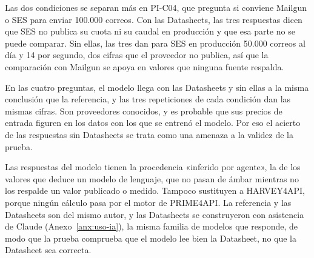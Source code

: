 Las dos condiciones se separan más en PI-C04, que pregunta si conviene Mailgun o SES para enviar 100.000 correos.
Con las Datasheets, las tres respuestas dicen que SES no publica su cuota ni su caudal en producción y que esa parte no se puede comparar.
Sin ellas, las tres dan para SES en producción 50.000 correos al día y 14 por segundo, dos cifras que el proveedor no publica, así que la comparación con Mailgun se apoya en valores que ninguna fuente respalda.

En las cuatro preguntas, el modelo llega con las Datasheets y sin ellas a la misma conclusión que la referencia, y las tres repeticiones de cada condición dan las mismas cifras.
Son proveedores conocidos, y es probable que sus precios de entrada figuren en los datos con los que se entrenó el modelo.
Por eso el acierto de las respuestas sin Datasheets se trata como una amenaza a la validez de la prueba.

Las respuestas del modelo tienen la procedencia «inferido por agente», la de los valores que deduce un modelo de lenguaje, que no pasan de ámbar mientras no los respalde un valor publicado o medido.
Tampoco sustituyen a HARVEY4API, porque ningún cálculo pasa por el motor de PRIME4API.
La referencia y las Datasheets son del mismo autor, y las Datasheets se construyeron con asistencia de Claude (Anexo~\ref{anx:uso-ia}), la misma familia de modelos que responde, de modo que la prueba comprueba que el modelo lee bien la Datasheet, no que la Datasheet sea correcta.
